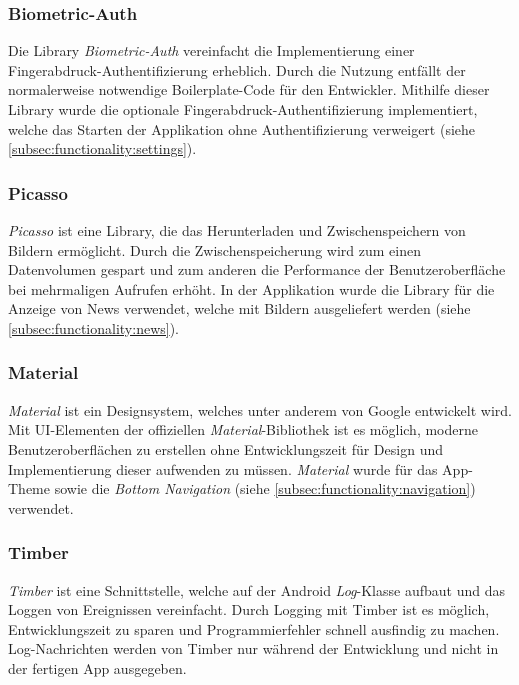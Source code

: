 \documentclass[a4paper]{article}
\begin{document}
\subsubsection{Biometric-Auth}
\label{subsubsec:technologies:bibs:biometricauth}
Die Library \textit{Biometric-Auth} \autocite{biometricauth} vereinfacht die Implementierung einer Fingerabdruck-Authentifizierung erheblich. Durch die Nutzung entfällt der normalerweise notwendige Boilerplate-Code für den Entwickler. Mithilfe dieser Library wurde die optionale Fingerabdruck-Authentifizierung implementiert, welche das Starten der Applikation ohne Authentifizierung verweigert (siehe \autoref{subsec:functionality:settings}).


\subsubsection{Picasso}
\label{subsubsec:technologies:bibs:picasso}
\textit{Picasso} \autocite{picasso} ist eine Library, die das Herunterladen und Zwischenspeichern von Bildern ermöglicht. Durch die Zwischenspeicherung wird zum einen Datenvolumen gespart und zum anderen die Performance der Benutzeroberfläche bei mehrmaligen Aufrufen erhöht. In der Applikation wurde die Library für die Anzeige von News verwendet, welche mit Bildern ausgeliefert werden (siehe \autoref{subsec:functionality:news}).


\subsubsection{Material}
\label{subsubsec:technologies:bibs:material}
\textit{Material} ist ein Designsystem, welches unter anderem von Google entwickelt wird.
Mit UI-Elementen der offiziellen \textit{Material}-Bibliothek ist es möglich, moderne Benutzeroberflächen zu erstellen ohne Entwicklungszeit für Design und Implementierung dieser aufwenden zu müssen.
\textit{Material} wurde für das App-Theme sowie die \textit{Bottom Navigation} (siehe \autoref{subsec:functionality:navigation}) verwendet.


\subsubsection{Timber}
\label{subsubsec:technologies:bibs:timber}
\textit{Timber} ist eine Schnittstelle, welche auf der Android \textit{Log}-Klasse aufbaut und das Loggen von Ereignissen vereinfacht.
Durch Logging mit Timber ist es möglich, Entwicklungszeit zu sparen und Programmierfehler schnell ausfindig zu machen.
Log-Nachrichten werden von Timber nur während der Entwicklung und nicht in der fertigen App ausgegeben.
\end{document}
